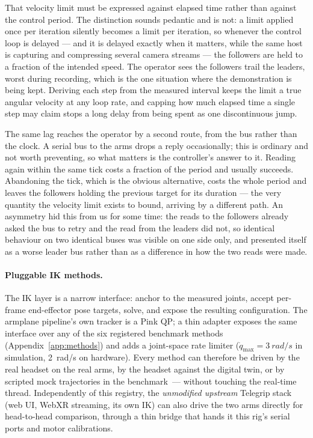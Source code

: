 That velocity limit must be expressed against elapsed time rather than against
the control period. The distinction sounds pedantic and is not: a limit applied
once per iteration silently becomes a limit per iteration, so whenever the
control loop is delayed --- and it is delayed exactly when it matters, while the
same host is capturing and compressing several camera streams --- the followers
are held to a fraction of the intended speed. The operator sees the followers
trail the leaders, worst during recording, which is the one situation where the
demonstration is being kept. Deriving each step from the measured interval keeps
the limit a true angular velocity at any loop rate, and capping how much elapsed
time a single step may claim stops a long delay from being spent as one
discontinuous jump.

The same lag reaches the operator by a second route, from the bus rather than
the clock. A serial bus to the arms drops a reply occasionally; this is ordinary
and not worth preventing, so what matters is the controller's answer to it.
Reading again within the same tick costs a fraction of the period and usually
succeeds. Abandoning the tick, which is the obvious alternative, costs the whole
period and leaves the followers holding the previous target for its duration ---
the very quantity the velocity limit exists to bound, arriving by a different
path. An asymmetry hid this from us for some time: the reads to the followers
already asked the bus to retry and the read from the leaders did not, so
identical behaviour on two identical buses was visible on one side only, and
presented itself as a worse leader bus rather than as a difference in how the
two reads were made.

\paragraph{Pluggable IK methods.}
The IK layer is a narrow interface: anchor to the measured joints,
accept per-frame end-effector pose targets, solve, and expose the
resulting configuration. The armplane pipeline's own tracker is a Pink
QP; a thin adapter exposes the same interface over any of the six
registered benchmark methods (Appendix~\ref{app:methods}) and adds a
joint-space rate limiter (\(\dot q_{\max}=\SI{3}{rad/s}\) in simulation,
\SI{2}{rad/s} on hardware). Every method can therefore be driven by the
real headset on the real arms, by the headset against the digital twin,
or by scripted mock trajectories in the benchmark~--- without touching
the real-time thread. Independently of this registry, the
\emph{unmodified upstream} Telegrip stack (web UI, WebXR streaming, its
own IK) can also drive the two arms directly for head-to-head
comparison, through a thin bridge that hands it this rig's serial ports
and motor calibrations.

